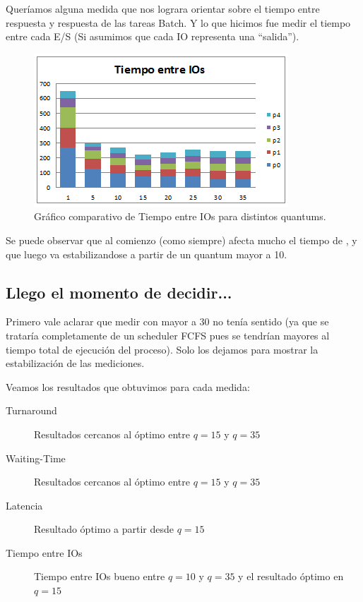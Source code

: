 Quer\'iamos alguna medida que nos lograra orientar sobre el tiempo entre respuesta y respuesta de las tareas Batch. Y lo que hicimos fue medir el tiempo entre cada E/S (Si asumimos que cada IO representa una ``salida'').

\begin{figure}[H]
  \centering
    \includegraphics{img/tiempoEntreIOs.png}
    \caption{Gr\'afico comparativo de Tiempo entre IOs para distintos quantums.}
\end{figure}

Se puede observar que al comienzo (como siempre) afecta mucho el tiempo de \cs, y que luego va estabilizandose a partir de un quantum mayor a 10.

\subsection{Llego el momento de decidir... }

Primero vale aclarar que medir con \quantum mayor a 30 no ten\'ia sentido (ya que se tratar\'ia completamente de un scheduler FCFS pues se tendr\'ian \quantums mayores al tiempo total de ejecuci\'on del proceso). Solo los dejamos para mostrar la estabilizaci\'on de las mediciones.

Veamos los resultados que obtuvimos para cada medida:

\begin{description}
 \item[Turnaround] Resultados cercanos al \'optimo entre $q=15$ y $q=35$
 \item[Waiting-Time] Resultados cercanos al \'optimo entre $q=15$ y $q=35$
 \item[Latencia] Resultado \'optimo a partir desde $q=15$
 \item[Tiempo entre IOs] Tiempo entre IOs bueno entre $q=10$ y $q=35$ y el resultado \'optimo en $q=15$
\end{description}

